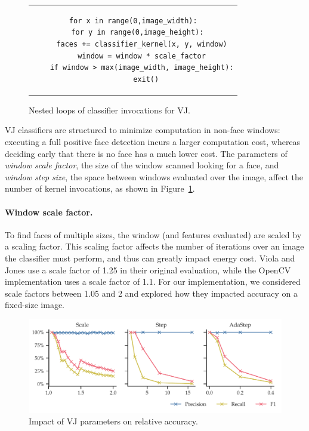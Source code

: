 \begin{figure}
\begin{tabular}{c}  %
\begin{lstlisting}
for x in range(0,image_width):
  for y in range(0,image_height):
    faces += classifier_kernel(x, y, window)
    window = window * scale_factor
    if window > max(image_width, image_height):
      exit()
\end{lstlisting}
\end{tabular}
\caption{Nested loops of classifier invocations for VJ.}
\label{fig:vj-algo}
\end{figure}


VJ classifiers are structured to minimize computation in non-face windows: executing a full positive face detection incurs a larger computation cost, whereas deciding early that there is no face has a much lower cost.
The parameters of \textit{window scale factor}, the size of the window scanned looking for a face, and \textit{window step size}, the space between windows evaluated over the image, affect the number of kernel invocations, as shown in Figure~\ref{fig:vj-algo}.

\paragraph{Window scale factor.}
To find faces of
multiple sizes, the window (and features evaluated) are scaled by a scaling factor. This scaling factor
affects the number of iterations over an image the classifier must perform, and thus can greatly impact
energy cost. Viola and Jones use a scale factor of 1.25 in their original evaluation, while the OpenCV
implementation uses a scale factor of 1.1. For our implementation, we considered scale factors between 1.05
and 2 and explored how they impacted accuracy on a fixed-size image.

\begin{figure}
\centering
      \includegraphics[width=\textwidth]{nsp-figs/vj_algo_accuracy2.pdf}
    \caption{Impact of VJ parameters on relative accuracy.}
    \label{fig:vj-accuracy}

\end{figure}

